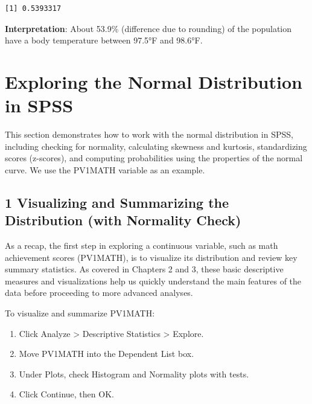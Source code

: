 \documentclass[
  letterpaper,
  DIV=11,
  numbers=noendperiod]{scrreprt}
\begin{document}
\begin{verbatim}
[1] 0.5393317
\end{verbatim}

\textbf{Interpretation}: About 53.9\% (difference due to rounding) of
the population have a body temperature between 97.5°F and 98.6°F.


\chapter*{Exploring the Normal Distribution in
SPSS}\label{exploring-the-normal-distribution-in-spss}


This section demonstrates how to work with the normal distribution in
SPSS, including checking for normality, calculating skewness and
kurtosis, standardizing scores (z-scores), and computing probabilities
using the properties of the normal curve. We use the PV1MATH variable as
an example.

\section*{1 Visualizing and Summarizing the Distribution (with Normality
Check)}\label{visualizing-and-summarizing-the-distribution-with-normality-check}


As a recap, the first step in exploring a continuous variable, such as
math achievement scores (PV1MATH), is to visualize its distribution and
review key summary statistics. As covered in Chapters 2 and 3, these
basic descriptive measures and visualizations help us quickly understand
the main features of the data before proceeding to more advanced
analyses.

To visualize and summarize PV1MATH:

\begin{enumerate}
\def\labelenumi{\arabic{enumi}.}
\item
  Click Analyze \textgreater{} Descriptive Statistics \textgreater{}
  Explore.
\item
  Move PV1MATH into the Dependent List box.
\item
  Under Plots, check Histogram and Normality plots with tests.
\item
  Click Continue, then OK.
\end{enumerate}
\end{document}
